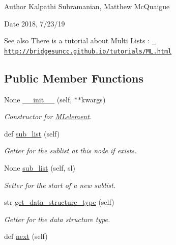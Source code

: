 \begin{DoxyAuthor}{Author}
Kalpathi Subramanian, Matthew Mc\+Quaigue
\end{DoxyAuthor}
\begin{DoxyDate}{Date}
2018, 7/23/19
\end{DoxyDate}
\begin{DoxySeeAlso}{See also}
There is a tutorial about Multi Lists \+: \href{http://bridgesuncc.github.io/tutorials/ML.html}{\texttt{ http\+://bridgesuncc.\+github.\+io/tutorials/\+M\+L.\+html}} 
\end{DoxySeeAlso}
\subsection*{Public Member Functions}
\begin{DoxyCompactItemize}
\item 
None \mbox{\hyperlink{classbridges_1_1ml__element_1_1_m_lelement_abd5ccc3a5438e2ed1812be381f4fb8a4}{\+\_\+\+\_\+init\+\_\+\+\_\+}} (self, $\ast$$\ast$kwargs)
\begin{DoxyCompactList}\small\item\em Constructor for \mbox{\hyperlink{classbridges_1_1ml__element_1_1_m_lelement}{M\+Lelement}}. \end{DoxyCompactList}\item 
def \mbox{\hyperlink{classbridges_1_1ml__element_1_1_m_lelement_a1b02783280dacd20982bb06a1e3070f4}{sub\+\_\+list}} (self)
\begin{DoxyCompactList}\small\item\em Getter for the sublist at this node if exists. \end{DoxyCompactList}\item 
None \mbox{\hyperlink{classbridges_1_1ml__element_1_1_m_lelement_a7d86232e446b7628b35963de4730ceb7}{sub\+\_\+list}} (self, sl)
\begin{DoxyCompactList}\small\item\em Setter for the start of a new sublist. \end{DoxyCompactList}\item 
str \mbox{\hyperlink{classbridges_1_1ml__element_1_1_m_lelement_a756749f461e226ce7ae7e46f6efa48f8}{get\+\_\+data\+\_\+structure\+\_\+type}} (self)
\begin{DoxyCompactList}\small\item\em Getter for the data structure type. \end{DoxyCompactList}\item 
def \mbox{\hyperlink{classbridges_1_1ml__element_1_1_m_lelement_a951d30261514e6eaefdd7d60f1c77f73}{next}} (self)
$$
\end{DoxyCompactItemize}
